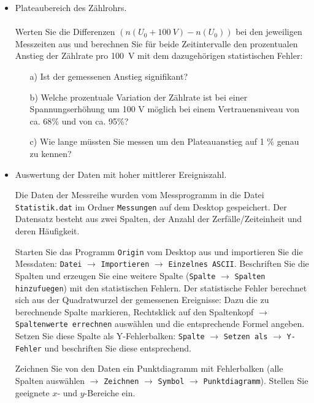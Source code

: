 \documentclass{../papanleitung}
\begin{document}
\begin{itemize}
  \item Plateaubereich des Z\"{a}hlrohrs.\\
  \\Werten Sie die Differenzen $(n(U_0+100~V) - n(U_0))$  bei den jeweiligen Messzeiten aus und
  berechnen Sie f\"{u}r beide Zeitintervalle den prozentualen Anstieg der Z\"{a}hlrate pro 100~V mit dem dazugeh\"{o}rigen
  statistischen Fehler:
  \begin{itemize}
    \item [a)]	Ist der gemessenen Anstieg signifikant?
    \item [b)]	Welche prozentuale Variation der Z\"{a}hlrate ist bei einer Spannungserh\"{o}hung um 100 V m\"{o}glich bei einem Vertrauensniveau von ca. 68$\%$ und von ca. 95$\%$?
    \item [c)]	Wie lange m\"{u}ssten Sie messen um den Plateauanstieg auf 1 $\%$ genau zu kennen?
  \end{itemize}
  \item  Auswertung der Daten mit hoher mittlerer Ereigniszahl.

  Die Daten der Messreihe wurden vom Messprogramm in die Datei  \verb"Statistik.dat" im Ordner  \verb"Messungen"  auf dem Desktop gespeichert. Der Datensatz besteht aus zwei Spalten, der Anzahl der Zerf\"{a}lle/Zeiteinheit und deren H\"{a}ufigkeit.
  
  \begin{usingorigin}
    Starten Sie das Programm \verb"Origin" vom Desktop aus und importieren Sie die Messdaten:
\verb"Datei" $\rightarrow$ \verb"Importieren" $\rightarrow$ \verb"Einzelnes ASCII". Beschriften Sie die Spalten und erzeugen Sie eine weitere Spalte (\verb"Spalte" $\rightarrow$ \verb"Spalten hinzufuegen") mit den statistischen Fehlern. Der statistische Fehler berechnet sich aus der Quadratwurzel der gemessenen Ereignisse: Dazu die zu berechnende Spalte markieren, Rechtsklick auf den Spaltenkopf $\rightarrow$ \verb"Spaltenwerte errechnen" ausw\"{a}hlen und die entsprechende Formel angeben. Setzen Sie diese Spalte als  Y-Fehlerbalken: \verb"Spalte" $\rightarrow$ \verb"Setzen als" $\rightarrow$ \verb"Y-Fehler" und beschriften Sie diese entsprechend.

Zeichnen Sie von den Daten ein Punktdiagramm mit Fehlerbalken (alle Spalten ausw\"{a}hlen  $\rightarrow$ \verb"Zeichnen" $\rightarrow$ \verb"Symbol" $\rightarrow$ \verb"Punktdiagramm"). Stellen Sie geeignete $x$- und $y$-Bereiche ein.
\end{usingorigin}


\end{itemize}
\end{document}
